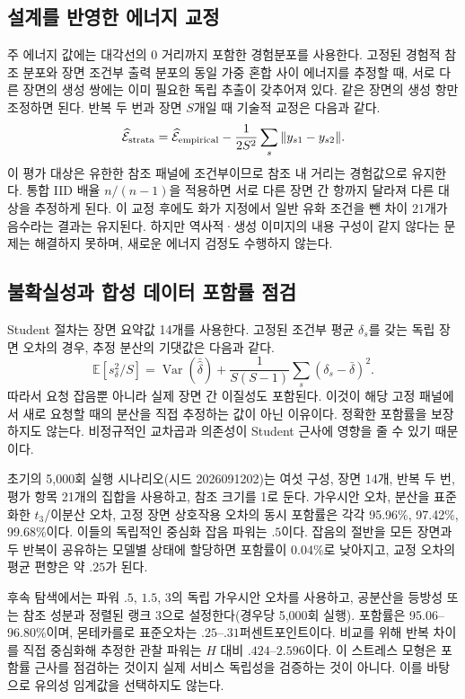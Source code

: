 \documentclass[11pt,a4paper]{article}
\begin{document}
\subsection{설계를 반영한 에너지 교정}
주 에너지 값에는 대각선의 0 거리까지 포함한 경험분포를 사용한다. 고정된 경험적 참조 분포와 장면 조건부 출력 분포의 동일 가중 혼합 사이 에너지를 추정할 때, 서로 다른 장면의 생성 쌍에는 이미 필요한 독립 추출이 갖추어져 있다. 같은 장면의 생성 항만 조정하면 된다. 반복 두 번과 장면 $S$개일 때 기술적 교정은 다음과 같다.
\[
 \widehat{\mathcal E}_{\rm strata}
 =\widehat{\mathcal E}_{\rm empirical}
 -\frac1{2S^2}\sum_s\|y_{s1}-y_{s2}\|.
\]
이 평가 대상은 유한한 참조 패널에 조건부이므로 참조 내 거리는 경험값으로 유지한다. 통합 IID 배율 $n/(n-1)$을 적용하면 서로 다른 장면 간 항까지 달라져 다른 대상을 추정하게 된다. 이 교정 후에도 화가 지정에서 일반 유화 조건을 뺀 차이 21개가 음수라는 결과는 유지된다. 하지만 역사적·생성 이미지의 내용 구성이 같지 않다는 문제는 해결하지 못하며, 새로운 에너지 검정도 수행하지 않는다.

\subsection{불확실성과 합성 데이터 포함률 점검}
Student 절차는 장면 요약값 14개를 사용한다. 고정된 조건부 평균 $\delta_s$를 갖는 독립 장면 오차의 경우, 추정 분산의 기댓값은 다음과 같다.
\[
 \mathbb E[s_\delta^2/S]
 =\operatorname{Var}(\bar{\widehat\delta})
 +\frac1{S(S-1)}\sum_s(\delta_s-\bar\delta)^2.
\]
따라서 요청 잡음뿐 아니라 실제 장면 간 이질성도 포함된다. 이것이 해당 고정 패널에서 새로 요청할 때의 분산을 직접 추정하는 값이 아닌 이유이다. 정확한 포함률을 보장하지도 않는다. 비정규적인 교차곱과 의존성이 Student 근사에 영향을 줄 수 있기 때문이다.

초기의 5,000회 실행 시나리오(시드 2026091202)는 여섯 구성, 장면 14개, 반복 두 번, 평가 항목 21개의 집합을 사용하고, 참조 크기를 1로 둔다. 가우시안 오차, 분산을 표준화한 $t_3$/이분산 오차, 고정 장면 상호작용 오차의 동시 포함률은 각각 95.96\%, 97.42\%, 99.68\%이다. 이들의 독립적인 중심화 잡음 파워는 $.5$이다. 잡음의 절반을 모든 장면과 두 반복이 공유하는 모델별 상태에 할당하면 포함률이 0.04\%로 낮아지고, 교정 오차의 평균 편향은 약 $.25$가 된다.

후속 탐색에서는 파워 $.5$, $1.5$, $3$의 독립 가우시안 오차를 사용하고, 공분산을 등방성 또는 참조 성분과 정렬된 랭크 3으로 설정한다(경우당 5,000회 실행). 포함률은 95.06--96.80\%이며, 몬테카를로 표준오차는 $.25$--$.31$퍼센트포인트이다. 비교를 위해 반복 차이를 직접 중심화해 추정한 관찰 파워는 $H$ 대비 $.424$--$2.596$이다. 이 스트레스 모형은 포함률 근사를 점검하는 것이지 실제 서비스 독립성을 검증하는 것이 아니다. 이를 바탕으로 유의성 임계값을 선택하지도 않는다.
\end{document}

